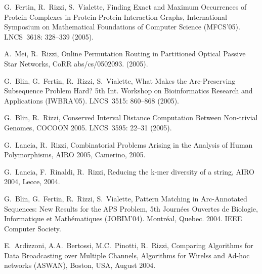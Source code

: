 \begin{etaremune}
\vspace{-1.8mm}
  \item {G.~Fertin, R.~Rizzi, S.~Vialette},
   \newblock Finding Exact and Maximum Occurrences
of Protein Complexes in Protein-Protein Interaction Graphs,
   \newblock International Symposium on Mathematical Foundations of Computer Science (MFCS'05).
   \newblock LNCS~3618: 328--339 (2005).

\vspace{-1.8mm}
  \item {A.~Mei, R.~Rizzi},
   \newblock Online Permutation Routing in Partitioned Optical Passive Star Networks,
   \newblock CoRR abs/cs/0502093. (2005).

\vspace{-1.8mm}
  \item {G.~Blin, G.~Fertin, R.~Rizzi, S.~Vialette},
   \newblock What Makes the Arc-Preserving Subsequence Problem Hard?
   \newblock 5th Int. Workshop on Bioinformatics Research and Applications (IWBRA'05).
   \newblock  LNCS~3515: 860--868 (2005).

\vspace{-1.8mm}
  \item {G.~Blin, R.~Rizzi},
   \newblock Conserved Interval Distance Computation Between Non-trivial Genomes,
   \newblock COCOON 2005.
   \newblock  LNCS~3595: 22--31 (2005).

\vspace{-1.8mm}
  \item {G.~Lancia, R.~Rizzi},
   \newblock Combinatorial Problems Arising in the Analysis of Human Polymorphisms,
   \newblock AIRO 2005, Camerino, 2005.

\vspace{-1.8mm}
  \item {G.~Lancia, F.~Rinaldi, R.~Rizzi},
   \newblock Reducing the k-mer diversity of a string,
   \newblock AIRO 2004, Lecce, 2004.

\vspace{-1.8mm}
  \item {G.~Blin, G.~Fertin, R.~Rizzi, S.~Vialette},
   \newblock Pattern Matching in Arc-Annotated Sequences: New Results for the APS Problem,
   \newblock 5th Journ\'ees Ouvertes de Biologie, Informatique et Math\'ematiques (JOBIM'04).
   \newblock Montr\'eal, Quebec. 2004.
   \newblock IEEE Computer Society.

\vspace{-1.8mm}
  \item {E.~Ardizzoni, A.A.~Bertossi, M.C.~Pinotti, R.~Rizzi},
   \newblock Comparing Algorithms for Data Broadcasting over Multiple Channels,
   \newblock Algorithms for Wirelss and Ad-hoc networks (ASWAN),
   \newblock Boston, USA, August 2004.


\end{etaremune}
